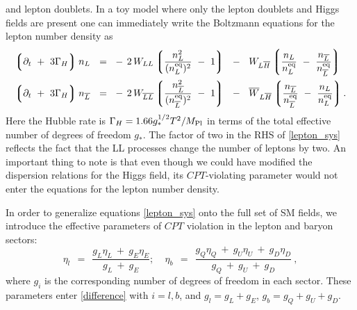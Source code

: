 \documentclass[12pt]{revtex4}
\newcommand{\eq}{{\rm eq}}
\newcommand{\lgr}{\left\lgroup}
\newcommand{\rgr}{\right\rgroup}
\newcommand{\Mpl}{M_{\rm Pl}}
\newcommand{\p}{\partial}
\newcommand{\ov}{\overline}
\begin{document}
	and lepton doublets.
	In a toy model where only the lepton doublets and Higgs fields are present 
    one can immediately write the Boltzmann equations for the lepton number density as
\begin{equation}
\label{lepton_sys}
\begin{split}
	\lgr \p_t ~+~ 3\Gamma_H \rgr 
		n_L ~~=~~ &
	-\, 2\, W_{LL} \lgr \frac{n_L^2}{(n_L^\eq)^2} ~-~ 1 \rgr
	~~-~~
	W_{L\ov{H}} \lgr \frac{n_L}{n_L^\eq} ~-~ 
			\frac{n_{\ov{L}}}{n_{\ov{L}}^\eq} \rgr  \\
	\lgr \p_t ~+~ 3\Gamma_H \rgr 
		n_{\ov{L}} ~~=~~ &
	-\, 2\, W_{\ov{LL}} \lgr 
		\frac{n_{\ov{L}}^2}{(n_{\ov{L}}^\eq)^2} ~-~ 1 \rgr
	~~-~~
	\ov{W}_{L\ov{H}} \lgr \frac{n_{\ov{L}}}{n_{\ov{L}}^\eq} ~-~ 
			\frac{n_L}{n_L^\eq} \rgr.  \\
\end{split}
\end{equation}
	Here the Hubble rate is $\Gamma_H = 1.66 g_*^{1/2} T^2/\Mpl $ in terms of the 
total effective number of degrees of freedom $g_*$. 
The factor of two in the RHS of \eqref{lepton_sys} reflects the fact 
	that the LL processes change the number of leptons by two.
	An important thing to note is that even though we could have 
	modified the dispersion relations for the Higgs field, 
	its $CPT$-violating parameter would not enter the equations for the lepton number
	density.
	
	In order to generalize equations \eqref{lepton_sys} onto the full set of 
	SM fields, we introduce the effective parameters of $CPT$ violation in the 
	lepton and baryon sectors:
\begin{equation}
	\eta_l ~~=~~ \frac{ g_L \eta_L ~+~ g_E \eta_E } { g_L ~+~ g_E };~~~~~\eta_b ~~=~~ \frac{g_Q \eta_Q ~+~ g_U \eta_U ~+~ g_D \eta_D} 
			    {g_Q ~+~ g_U ~+~ g_D}~,
\label{effective}
  \end{equation}
where $g_i$ is the corresponding number of degrees of freedom in each sector. These parameters 
enter \eqref{difference} with $i=l,b$, and $g_l = g_L +g_E $,  $g_b= g_Q+g_U+g_D$. 


\end{document}
